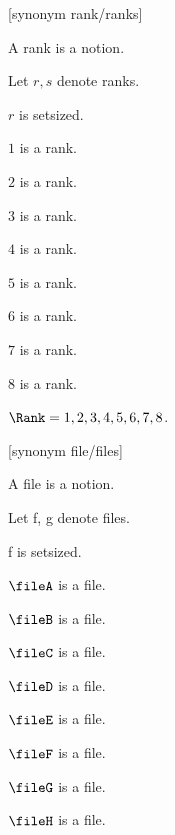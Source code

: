 \begin{forthel}

    [synonym rank/ranks]
    \begin{signature} A rank is a notion. \end{signature}
    Let $r, s$ denote ranks.

    \begin{axiom} $r$ is setsized. \end{axiom}

    \begin{signature} $1$ is a rank. \end{signature}
    \begin{signature} $2$ is a rank. \end{signature}
    \begin{signature} $3$ is a rank. \end{signature}
    \begin{signature} $4$ is a rank. \end{signature}
    \begin{signature} $5$ is a rank. \end{signature}
    \begin{signature} $6$ is a rank. \end{signature}
    \begin{signature} $7$ is a rank. \end{signature}
    \begin{signature} $8$ is a rank. \end{signature}

    \begin{definition} $\Rank = {1,2,3,4,5,6,7,8}$. \end{definition}

    [synonym file/files]
    \begin{signature} A file is a notion. \end{signature}
    Let f, g denote files.

    \begin{axiom} f is setsized. \end{axiom}

    \begin{signature} $\fileA$ is a file. \end{signature}
    \begin{signature} $\fileB$ is a file. \end{signature}
    \begin{signature} $\fileC$ is a file. \end{signature}
    \begin{signature} $\fileD$ is a file. \end{signature}
    \begin{signature} $\fileE$ is a file. \end{signature}
    \begin{signature} $\fileF$ is a file. \end{signature}
    \begin{signature} $\fileG$ is a file. \end{signature}
    \begin{signature} $\fileH$ is a file. \end{signature}


\end{forthel}
